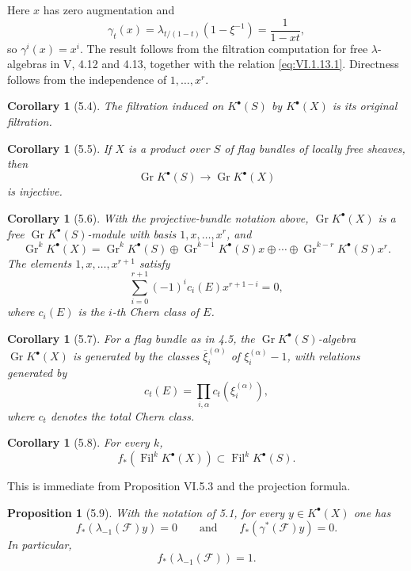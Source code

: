 \documentclass[11pt]{article}
\theoremstyle{plain}
\newtheorem{proposition}[theorem]{Proposition}
\newtheorem{corollary}[theorem]{Corollary}
\theoremstyle{definition}
\theoremstyle{remark}
\DeclareMathOperator{\Gr}{Gr}
\providecommand{\Fil}{\operatorname{Fil}}
\begin{document}
Here $x$ has zero augmentation and
\[
\gamma_t(x)=\lambda_{t/(1-t)}(1-\xi^{-1})=\frac{1}{1-xt},
\]
so $\gamma^i(x)=x^i$. The result follows from the filtration computation for free $\lambda$-algebras in V, 4.12 and 4.13, together with the relation \eqref{eq:VI.1.13.1}. Directness follows from the independence of $1,\ldots,x^r$.

\begin{corollary}[5.4]
The filtration induced on $K^{\bullet}(S)$ by $K^{\bullet}(X)$ is its original filtration.
\end{corollary}

\begin{corollary}[5.5]
If $X$ is a product over $S$ of flag bundles of locally free sheaves, then
\[
\Gr K^{\bullet}(S)\longrightarrow \Gr K^{\bullet}(X)
\]
is injective.
\end{corollary}

\begin{corollary}[5.6]
With the projective-bundle notation above, $\Gr K^{\bullet}(X)$ is a free $\Gr K^{\bullet}(S)$-module with basis $1,x,\ldots,x^r$, and
\[
\Gr^kK^{\bullet}(X)=\Gr^kK^{\bullet}(S)\oplus\Gr^{k-1}K^{\bullet}(S)x\oplus\cdots\oplus\Gr^{k-r}K^{\bullet}(S)x^r.
\]
The elements $1,x,\ldots,x^{r+1}$ satisfy
\begin{equation}\label{eq:VI.5.6}
\sum_{i=0}^{r+1}(-1)^ic_i(E)x^{r+1-i}=0,
\end{equation}
where $c_i(E)$ is the $i$-th Chern class of $E$.
\end{corollary}

\begin{corollary}[5.7]
For a flag bundle as in 4.5, the $\Gr K^{\bullet}(S)$-algebra $\Gr K^{\bullet}(X)$ is generated by the classes $\overline\xi_i^{(\alpha)}$ of $\xi_i^{(\alpha)}-1$, with relations generated by
\[
c_t(E)=\prod_{i,\alpha}c_t(\xi_i^{(\alpha)}),
\]
where $c_t$ denotes the total Chern class.
\end{corollary}

\begin{corollary}[5.8]
For every $k$,
\[
f_*(\Fil^kK^{\bullet}(X))\subset \Fil^kK^{\bullet}(S).
\]
\end{corollary}
This is immediate from Proposition VI.5.3 and the projection formula.

\begin{proposition}[5.9]
With the notation of 5.1, for every $y\in K^{\bullet}(X)$ one has
\[
f_*(\lambda_{-1}(\mathcal F)y)=0
\qquad\text{and}\qquad
f_*(\gamma^*(\mathcal F)y)=0.
\]
In particular,
\[
f_*(\lambda_{-1}(\mathcal F))=1.
\]
\end{proposition}
\end{document}

